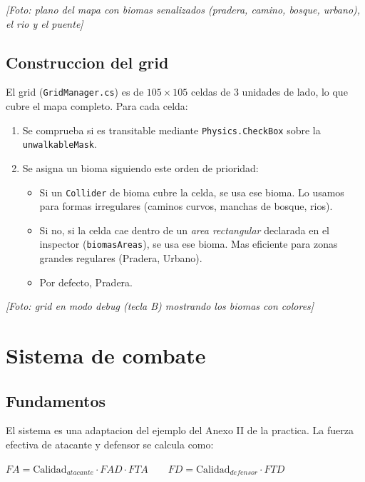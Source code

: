 \documentclass[12pt,a4paper]{article}
\newcommand{\fotoplaceholder}[1]{%
    \par\medskip\noindent%
    \begin{center}%
    \begin{tcolorbox}[
        colback=fotobg,
        colframe=fotoborder,
        boxrule=0.8pt,
        arc=2pt,
        width=0.85\textwidth,
        halign=center,
        valign=center,
        height=2.4cm
    ]
    \itshape\color{gray} [Foto: #1]
    \end{tcolorbox}%
    \end{center}\medskip%
}
\begin{document}
\fotoplaceholder{plano del mapa con biomas senalizados (pradera, camino, bosque, urbano), el rio y el puente}

\subsection{Construccion del grid}

El grid (\texttt{GridManager.cs}) es de $105 \times 105$ celdas de 3
unidades de lado, lo que cubre el mapa completo. Para cada celda:

\begin{enumerate}[leftmargin=1.5em]
    \item Se comprueba si es transitable mediante \texttt{Physics.CheckBox} sobre la \texttt{unwalkableMask}.
    \item Se asigna un bioma siguiendo este orden de prioridad:
    \begin{itemize}
        \item Si un \texttt{Collider} de bioma cubre la celda, se usa ese bioma. Lo usamos para formas irregulares (caminos curvos, manchas de bosque, rios).
        \item Si no, si la celda cae dentro de un \emph{area rectangular} declarada en el inspector (\texttt{biomasAreas}), se usa ese bioma. Mas eficiente para zonas grandes regulares (Pradera, Urbano).
        \item Por defecto, Pradera.
    \end{itemize}
\end{enumerate}

\fotoplaceholder{grid en modo debug (tecla B) mostrando los biomas con colores}

\section{Sistema de combate}

\subsection{Fundamentos}

El sistema es una adaptacion del ejemplo del Anexo II de la practica.
La fuerza efectiva de atacante y defensor se calcula como:

\begin{formulabox}
\centering
$FA = \text{Calidad}_{atacante} \cdot FAD \cdot FTA \qquad FD = \text{Calidad}_{defensor} \cdot FTD$
\end{formulabox}
\end{document}
